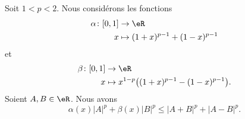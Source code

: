 \begin{lemma}     \label{LEMooWIPYooMZqjbn}
    Soit \( 1<p<2\). Nous considérons les fonctions
    \begin{equation}
        \begin{aligned}
            \alpha\colon \mathopen[ 0 , 1 \mathclose] & \to \eR                         \\
            x                                         & \mapsto (1+x)^{p-1}+(1-x)^{p-1}
        \end{aligned}
    \end{equation}
    et
    \begin{equation}
        \begin{aligned}
            \beta\colon \mathopen[ 0 , 1 \mathclose] & \to \eR                                             \\
            x                                        & \mapsto x^{1-p}\big( (1+x)^{p-1}-(1-x)^{p-1} \big).
        \end{aligned}
    \end{equation}
    Soient \( A,B\in \eR\). Nous avons
    \begin{equation}
        \alpha(x)| A |^p+\beta(x)| B |^p\leq | A+B |^p+| A-B |^p.
    \end{equation}
\end{lemma}


